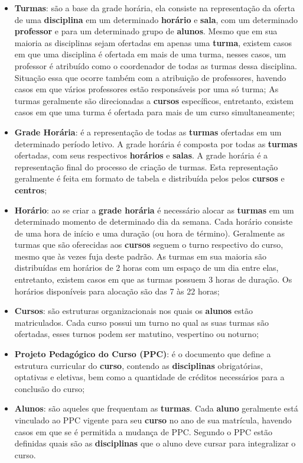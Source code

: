 \begin{itemize}
  \item \textbf{Turmas}: são a base da grade horária, ela consiste na representação da oferta de uma \textbf{disciplina} em um determinado \textbf{horário} e \textbf{sala}, com um determinado \textbf{professor} e para um determinado grupo de \textbf{alunos}. Mesmo que em sua maioria as disciplinas sejam ofertadas em apenas uma \textbf{turma}, existem casos em que uma disciplina é ofertada em mais de uma turma, nesses casos, um professor é atribuído como o coordenador de todas as turmas dessa disciplina. Situação essa que ocorre também com a atribuição de professores, havendo casos em que vários professores estão responsáveis por uma só turma; As turmas geralmente são direcionadas a \textbf{cursos} específicos, entretanto, existem casos em que uma turma é ofertada para mais de um curso simultaneamente;
  \item \textbf{Grade Horária}: é a representação de todas as \textbf{turmas} ofertadas em um determinado período letivo. A grade horária é composta por todas as \textbf{turmas} ofertadas, com seus respectivos \textbf{horários} e \textbf{salas}. A grade horária é a representação final do processo de criação de turmas. Esta representação geralmente é feita em formato de tabela e distribuída pelos pelos \textbf{cursos} e \textbf{centros};
  \item \textbf{Horário}: ao se criar a \textbf{grade horária} é necessário alocar as \textbf{turmas} em um determinado momento de determinado dia da semana. Cada horário consiste de uma hora de início e uma duração (ou hora de término). Geralmente as turmas que são oferecidas aos \textbf{cursos} seguem o turno respectivo do curso, mesmo que às vezes fuja deste padrão. As turmas em sua maioria são distribuídas em horários de 2 horas com um espaço de um dia entre elas, entretanto, existem casos em que as turmas possuem 3 horas de duração. Os horários disponíveis para alocação são das 7 às 22 horas;
  \item \textbf{Cursos}: são estruturas organizacionais nos quais os \textbf{alunos} estão matriculados. Cada curso possui um turno no qual as suas turmas são ofertadas, esses turnos podem ser matutino, vespertino ou noturno;
  \item \textbf{Projeto Pedagógico do Curso (PPC)}: é o documento que define a estrutura curricular do \textbf{curso}, contendo as \textbf{disciplinas} obrigatórias, optativas e eletivas, bem como a quantidade de créditos necessários para a conclusão do curso;
  \item \textbf{Alunos}: são aqueles que frequentam as \textbf{turmas}. Cada \textbf{aluno} geralmente está vinculado ao PPC vigente para seu \textbf{curso} no ano de sua matrícula, havendo casos em que se é permitida a mudança de PPC. Segundo o PPC estão definidas quais são as \textbf{disciplinas} que o aluno deve cursar para integralizar o curso.
\end{itemize}
